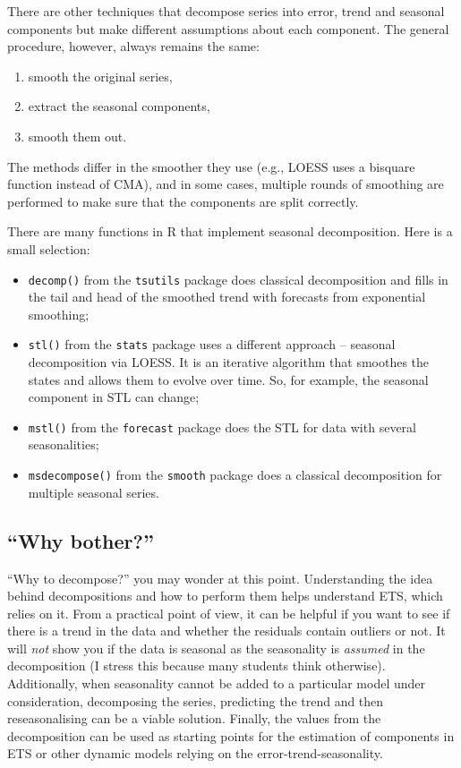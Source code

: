 \documentclass[]{book}
\providecommand{\tightlist}{%
  \setlength{\itemsep}{0pt}\setlength{\parskip}{0pt}}
\theoremstyle{definition}
\theoremstyle{definition}
\theoremstyle{definition}
\theoremstyle{definition}
\theoremstyle{remark}
\begin{document}
There are other techniques that decompose series into error, trend and seasonal components but make different assumptions about each component. The general procedure, however, always remains the same:

\begin{enumerate}
\def\labelenumi{\arabic{enumi}.}
\tightlist
\item
  smooth the original series,
\item
  extract the seasonal components,
\item
  smooth them out.
\end{enumerate}

The methods differ in the smoother they use (e.g., LOESS uses a bisquare function instead of CMA), and in some cases, multiple rounds of smoothing are performed to make sure that the components are split correctly.

There are many functions in R that implement seasonal decomposition. Here is a small selection:

\begin{itemize}
\tightlist
\item
  \texttt{decomp()} from the \texttt{tsutils} package does classical decomposition and fills in the tail and head of the smoothed trend with forecasts from exponential smoothing;
\item
  \texttt{stl()} from the \texttt{stats} package uses a different approach -- seasonal decomposition via LOESS. It is an iterative algorithm that smoothes the states and allows them to evolve over time. So, for example, the seasonal component in STL can change;
\item
  \texttt{mstl()} from the \texttt{forecast} package does the STL for data with several seasonalities;
\item
  \texttt{msdecompose()} from the \texttt{smooth} package does a classical decomposition for multiple seasonal series.
\end{itemize}

\hypertarget{why-bother}{%
\subsection{``Why bother?''}\label{why-bother}}

``Why to decompose?'' you may wonder at this point. Understanding the idea behind decompositions and how to perform them helps understand ETS, which relies on it. From a practical point of view, it can be helpful if you want to see if there is a trend in the data and whether the residuals contain outliers or not. It will \emph{not} show you if the data is seasonal as the seasonality is \emph{assumed} in the decomposition (I stress this because many students think otherwise). Additionally, when seasonality cannot be added to a particular model under consideration, decomposing the series, predicting the trend and then reseasonalising can be a viable solution. Finally, the values from the decomposition can be used as starting points for the estimation of components in ETS or other dynamic models relying on the error-trend-seasonality.
\end{document}
